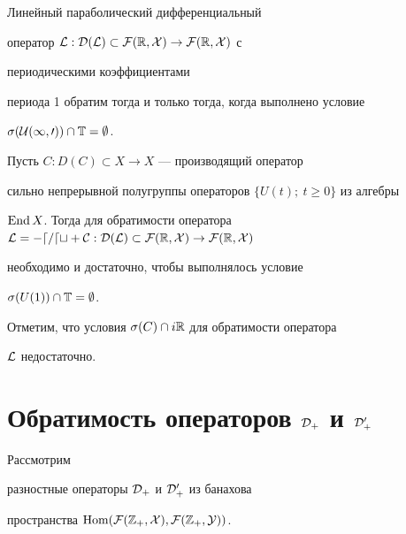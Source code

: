  


\begin{cor} 


Линейный параболический дифференциальный 


оператор $\cal L:D(\cal L)\subset\linebreak


\cal F(\Bbb R,X)\to\cal F(\Bbb R,X)$ с 


периодическими коэффициентами 


периода 1 обратим тогда и только тогда, когда выполнено условие 


$\sigma(\cal U(1,0))\cap\Bbb T=\emptyset$. 


\end{cor} 


 


\begin{cor} 


Пусть $C:D(C)\subset X\to X$ --- производящий оператор 


сильно непрерывной полугруппы операторов $\{U(t);\ t\ge0\}$ из алгебры 


$\End X$. Тогда для обратимости оператора $\cal L=-d/d t+C:D(\cal 


L)\subset\cal F(\Bbb R,X)\to\cal F(\Bbb R,X)$ 


необходимо и достаточно, чтобы выполнялось условие 


$\sigma(U(1))\cap\Bbb T=\emptyset$. 


\end{cor} 


 


Отметим, что условия $\sigma(C)\cap i\Bbb R$ для обратимости оператора 


$\cal L$ недостаточно. 


 


\section{Обратимость операторов $\cal D_+$ и $\cal D^0_+$} 


 


\noindent{}Рассмотрим


разностные операторы $\cal D_+$ и $\cal D^0_+$ из банахова 


пространства $\operatorname{Hom}(\cal F(\Bbb Z_+,X),\cal F(\Bbb Z_+,Y))$. 


